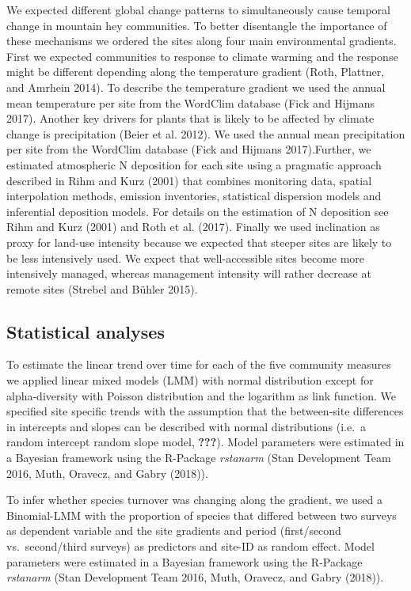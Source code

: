 \documentclass[fleqn,10pt,lineno]{wlpeerj} %
\theoremstyle{definition}
\theoremstyle{definition}
\theoremstyle{definition}
\theoremstyle{remark}
\begin{document}
We expected different global change patterns to simultaneously cause
temporal change in mountain hey communities. To better disentangle the
importance of these mechanisms we ordered the sites along four main
environmental gradients. First we expected communities to response to
climate warming and the response might be different depending along the
temperature gradient (Roth, Plattner, and Amrhein 2014). To describe the
temperature gradient we used the annual mean temperature per site from
the WordClim database (Fick and Hijmans 2017). Another key drivers for
plants that is likely to be affected by climate change is precipitation
(Beier et al. 2012). We used the annual mean precipitation per site from
the WordClim database (Fick and Hijmans 2017).Further, we estimated
atmospheric N deposition for each site using a pragmatic approach
described in Rihm and Kurz (2001) that combines monitoring data, spatial
interpolation methods, emission inventories, statistical dispersion
models and inferential deposition models. For details on the estimation
of N deposition see Rihm and Kurz (2001) and Roth et al. (2017). Finally
we used inclination as proxy for land-use intensity because we expected
that steeper sites are likely to be less intensively used. We expect
that well-accessible sites become more intensively managed, whereas
management intensity will rather decrease at remote sites (Strebel and
Bühler 2015).

\subsection*{Statistical analyses}\label{statistical-analyses}

To estimate the linear trend over time for each of the five community
measures we applied linear mixed models (LMM) with normal distribution
except for alpha-diversity with Poisson distribution and the logarithm
as link function. We specified site specific trends with the assumption
that the between-site differences in intercepts and slopes can be
described with normal distributions (i.e.~a random intercept random
slope model, {\textbf{???}}). Model parameters were estimated in a
Bayesian framework using the R-Package \emph{rstanarm} (Stan Development
Team 2016, Muth, Oravecz, and Gabry (2018)).

To infer whether species turnover was changing along the gradient, we
used a Binomial-LMM with the proportion of species that differed between
two surveys as dependent variable and the site gradients and period
(first/second vs.~second/third surveys) as predictors and site-ID as
random effect. Model parameters were estimated in a Bayesian framework
using the R-Package \emph{rstanarm} (Stan Development Team 2016, Muth,
Oravecz, and Gabry (2018)).
\end{document}
